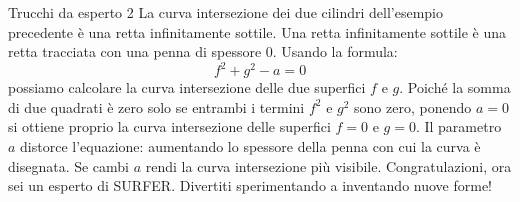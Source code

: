 \begin{surferPage}{Trucchi da esperto 2}
La curva intersezione dei due cilindri dell'esempio precedente \`e una retta infinitamente sottile. Una retta infinitamente sottile \`e una retta tracciata con una penna di spessore $0$. Usando la formula:
\[ f^2+g^2-a=0\]
possiamo calcolare la curva intersezione delle due superfici $f$ e $g$. Poich\'e la somma di due quadrati  \`e zero  solo se entrambi i termini $f^2$ e $g^2$ sono zero, ponendo $a=0$ si ottiene proprio la curva intersezione delle superfici $f=0$ e $g=0$.
Il parametro $a$ distorce l'equazione: aumentando lo spessore della penna con cui la curva \`e disegnata. Se cambi $a$ rendi la curva intersezione pi\`u visibile. 
\newline \newline
Congratulazioni, ora sei un esperto di SURFER. Divertiti sperimentando a inventando nuove forme!
\end{surferPage}
